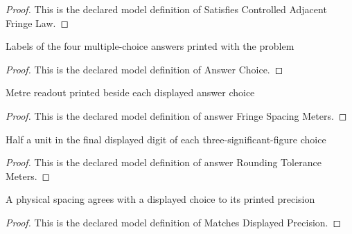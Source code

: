 \begin{proof}
  This is the declared model definition of Satisfies Controlled Adjacent Fringe Law.
\end{proof}
\begin{definition}
  \label{def:physics:phyx-mini-0121:phyxminiproblems-problemphyxmini0121-answerchoice}
  Labels of the four multiple-choice answers printed with the problem
\end{definition}
\begin{proof}
  This is the declared model definition of Answer Choice.
\end{proof}
\begin{definition}
  \label{def:physics:phyx-mini-0121:phyxminiproblems-problemphyxmini0121-answerfringespacingmeters}
  Metre readout printed beside each displayed answer choice
\end{definition}
\begin{proof}
  This is the declared model definition of answer Fringe Spacing Meters.
\end{proof}
\begin{definition}
  \label{def:physics:phyx-mini-0121:phyxminiproblems-problemphyxmini0121-answerroundingtolerancemeters}
  Half a unit in the final displayed digit of each three-significant-figure choice
\end{definition}
\begin{proof}
  This is the declared model definition of answer Rounding Tolerance Meters.
\end{proof}
\begin{definition}
  \label{def:physics:phyx-mini-0121:phyxminiproblems-problemphyxmini0121-matchesdisplayedprecision}
  A physical spacing agrees with a displayed choice to its printed precision
\end{definition}
\begin{proof}
  This is the declared model definition of Matches Displayed Precision.
\end{proof}
